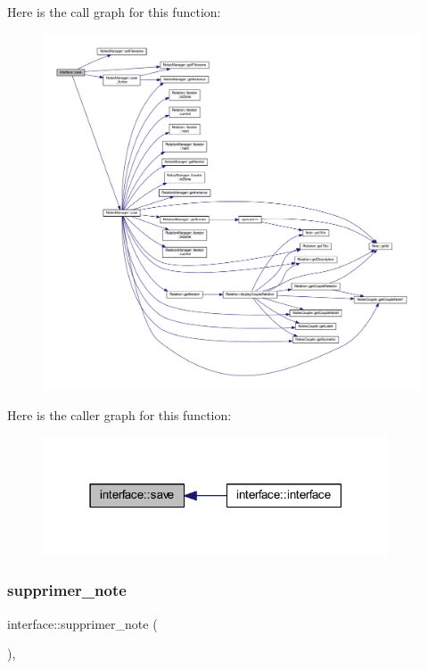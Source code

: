 Here is the call graph for this function\+:\nopagebreak
\begin{figure}[H]
\begin{center}
\leavevmode
\includegraphics[width=350pt]{classinterface_a319f133949e2be97a203f725c3f1e565_cgraph}
\end{center}
\end{figure}
Here is the caller graph for this function\+:\nopagebreak
\begin{figure}[H]
\begin{center}
\leavevmode
\includegraphics[width=291pt]{classinterface_a319f133949e2be97a203f725c3f1e565_icgraph}
\end{center}
\end{figure}
\mbox{\label{classinterface_aca23c755ba40ca8198010ff0487b22a8}} 
\subsubsection{\texorpdfstring{supprimer\+\_\+note}{supprimer\_note}}
{\footnotesize\ttfamily interface\+::supprimer\+\_\+note (\begin{DoxyParamCaption}{ }\end{DoxyParamCaption})\hspace{0.3cm}{\ttfamily [inline]}, {\ttfamily [slot]}}



